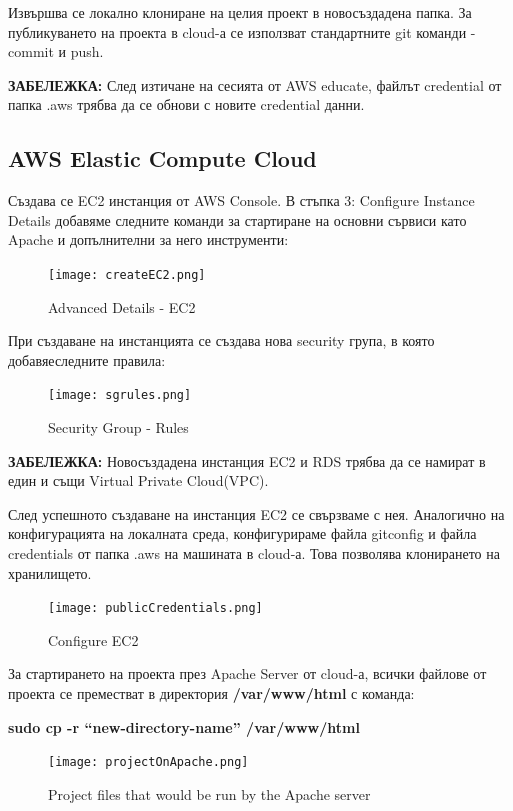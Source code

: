\documentclass[12pt]{article}
\begin{document}
\newpage

\noindent Извършва се локално клониране на целия проект в новосъздадена папка. За публикуването на проекта в cloud-а се използват стандартните git команди - commit и push.
\medskip

\noindent \textbf{ЗАБЕЛЕЖКА:} След изтичане на сесията от AWS educate, файлът credential от папка .aws трябва да се обнови с новите credential данни.

\subsection{AWS Elastic Compute Cloud}
\noindent Създава се EC2 инстанция от AWS Console. В стъпка 3: Configure Instance Details добавяме следните команди за стартиране на основни сървиси като Apache и допълнителни за него инструменти:
\medskip

\begin{figure}[h!]
\centering
    \texttt{[image: createEC2.png]}
  \caption{Advanced Details - EC2}
\end{figure}

\noindent При създаване на инстанцията се създава нова security група, в която добавяеследните правила: 
\begin{figure}[h!]
\centering
    \texttt{[image: sgrules.png]}
  \caption{Security Group - Rules}
\end{figure}

\noindent \textbf{ЗАБЕЛЕЖКА:} Новосъздадена инстанция EC2 и RDS трябва да се намират в един и същи Virtual Private Cloud(VPC).
\medskip

\noindent След успешното създаване на инстанция EC2 се свързваме с нея. Аналогично на конфигурацията на локалната среда, конфигурираме файла gitconfig и файла credentials от папка .aws на машината в cloud-а. Това позволява клонирането на хранилището.

\begin{figure}[h!]
\centering
    \texttt{[image: publicCredentials.png]}
  \caption{Configure EC2}
\end{figure}

\noindent За стартирането на проекта през Apache Server от cloud-а, всички файлове от проекта се преместват в директория \textbf{/var/www/html} с команда: 

\noindent \textbf{sudo cp -r “new-directory-name” /var/www/html}
\newpage

\begin{figure}[h!]
\centering
    \texttt{[image: projectOnApache.png]}
  \caption{Project files that would be run by the Apache server}
\end{figure}
\end{document}
